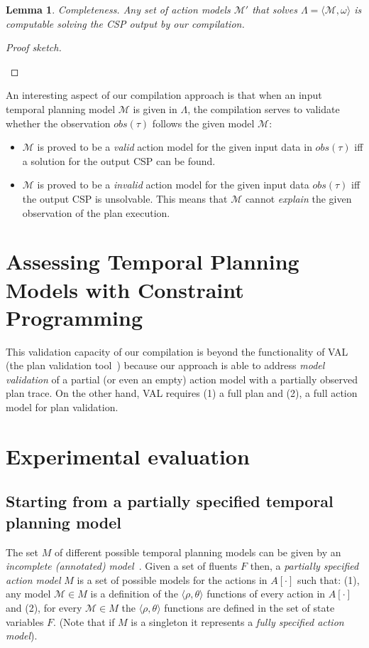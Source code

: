 \documentclass[letterpaper]{article} %
\newcommand{\tup}[1]{{\langle #1 \rangle}}
\newtheorem{lemma}[theorem]{Lemma}
\begin{document}
\begin{lemma}
Completeness. Any set of action models $\mathcal{M}'$ that solves $\Lambda=\tup{\mathcal{M},\omega}$ is computable solving the CSP output by our compilation.
\end{lemma}

\begin{proof}[Proof sketch]
\begin{small}
\end{small}
\end{proof}

An interesting aspect of our compilation approach is that when an input temporal planning model $\mathcal{M}$ is given in $\Lambda$, the compilation serves to validate whether the observation $obs(\tau)$ follows the given model $\mathcal{M}$:

\begin{itemize}
	\item $\mathcal{M}$ is proved to be a {\em valid} action model for the given input data in $obs(\tau)$ iff a solution for the output CSP can be found.
	\item $\mathcal{M}$ is proved to be a {\em invalid} action model for the given input data $obs(\tau)$ iff the output CSP is unsolvable. This means that $\mathcal{M}$ cannot {\em explain} the given observation of the plan execution.
\end{itemize}


\section{Assessing Temporal Planning Models with Constraint Programming}
This validation capacity of our compilation is beyond the functionality of VAL (the plan validation tool~\cite{howey2004val}) because our approach is able to address {\em model validation} of a partial (or even an empty) action model with a partially observed plan trace. On the other hand, VAL requires (1) a full plan and (2), a full action model for plan validation.

\section{Experimental evaluation}
\label{sec:evaluation}

\subsection{Starting from a partially specified temporal planning model}
The set $M$ of different possible temporal planning models can be given by an {\em incomplete (annotated) model}~\cite{sreedharan2018handling}. Given a set of fluents $F$ then, a {\em partially specified action model} $M$ is a set of possible models for the actions in $A[\cdot]$ such that: (1), any model $\mathcal{M}\in M$ is a definition of the $\tup{\rho,\theta}$ functions of every action in $A[\cdot]$ and (2), for every $\mathcal{M}\in M$ the $\tup{\rho,\theta}$ functions are defined in the set of state variables $F$. (Note that if $M$ is a singleton it represents a {\em fully specified action model}).
\end{document}

